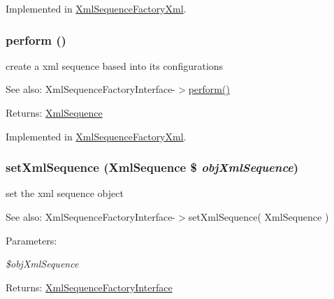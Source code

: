 Implemented in \hyperlink{class_xml_sequence_factory_xml_feb0ab0d5955fcae20ff5062fa59fd79}{XmlSequenceFactoryXml}.\hypertarget{interface_xml_sequence_factory_interface_469121070b5e6118f202517380558019}{
\subsubsection[{perform}]{\setlength{\rightskip}{0pt plus 5cm}perform ()}}
\label{interface_xml_sequence_factory_interface_469121070b5e6118f202517380558019}


create a xml sequence based into its configurations

\begin{Desc}
\item[See also:]XmlSequenceFactoryInterface-$>$\hyperlink{interface_xml_sequence_factory_interface_469121070b5e6118f202517380558019}{perform()} \end{Desc}
\begin{Desc}
\item[Returns:]\hyperlink{class_xml_sequence}{XmlSequence} \end{Desc}


Implemented in \hyperlink{class_xml_sequence_factory_xml_469121070b5e6118f202517380558019}{XmlSequenceFactoryXml}.\hypertarget{interface_xml_sequence_factory_interface_65967fe6cc76b0c0b28aa39e9acffcab}{
\subsubsection[{setXmlSequence}]{\setlength{\rightskip}{0pt plus 5cm}setXmlSequence ({\bf XmlSequence} \$ {\em objXmlSequence})}}
\label{interface_xml_sequence_factory_interface_65967fe6cc76b0c0b28aa39e9acffcab}


set the xml sequence object

\begin{Desc}
\item[See also:]XmlSequenceFactoryInterface-$>$setXmlSequence( XmlSequence ) \end{Desc}
\begin{Desc}
\item[Parameters:]
\begin{description}
\item[{\em \$objXmlSequence}]\end{description}
\end{Desc}
\begin{Desc}
\item[Returns:]\hyperlink{interface_xml_sequence_factory_interface}{XmlSequenceFactoryInterface} \end{Desc}


